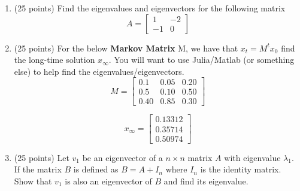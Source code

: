 \documentclass[10pt, a4paper]{article}
\theoremstyle{break}
\begin{document}
\begin{enumerate}
\item (25 points) Find the eigenvalues and eigenvectors for the following matrix
\begin{equation}
A=
\begin{bmatrix}
1 & -2 \\
-1 &0 
\end{bmatrix}
\nonumber
\end{equation}







\item (25 points) For the below \textbf{Markov Matrix} M, we have that $x_{t}=M^tx_0$ find the long-time solution $x_{\infty}$. You will want to use Julia/Matlab (or something else) to help
find the eigenvalues/eigenvectors.
\begin{equation}
M=
\begin{bmatrix}
0.1 & 0.05 &0.20 \\
0.5 & 0.10 & 0.50 \\
0.40 & 0.85 & 0.30 
\end{bmatrix}
\nonumber
\end{equation}

\begin{equation}
x_{\infty}=
\begin{bmatrix}
0.13312 \\
0.35714 \\
0.50974
\end{bmatrix}
\nonumber
\end{equation}




\item (25 points)  Let $v_1$ be an eigenvector of a $n \times n$ matrix $A$ with eigenvalue $\lambda_1$. If the matrix $B$ is defined as $B=A+I_n$ where $I_n$ is the identity matrix.  Show that $v_1$ is also an eigenvector of $B$ and find its eigenvalue. 


\end{enumerate}
\end{document}
